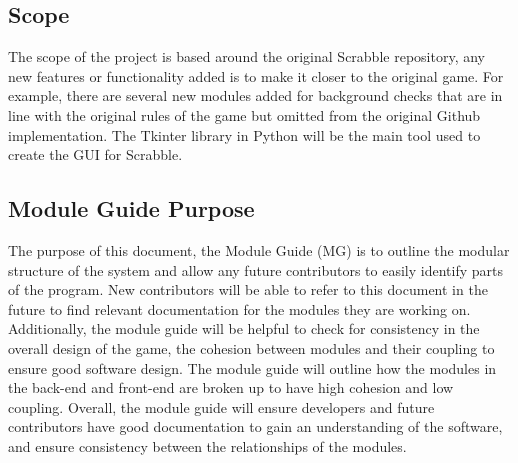 \documentclass[12pt, titlepage]{article}
\begin{document}
\subsection{Scope}

The scope of the project is based around the original Scrabble repository, any new features or functionality added is to make it closer to the original game. For example, there are several new modules added for background checks that are in line with the original rules of the game but omitted from the original Github implementation. The Tkinter library in Python will be the main tool used to create the GUI for Scrabble.

\subsection{Module Guide Purpose}
The purpose of this document, the Module Guide (MG) is to outline the modular structure of the system and allow any future contributors to easily identify parts of the program. New contributors will be able to refer to this document in the future to find relevant documentation for the modules they are working on. Additionally, the module guide will be helpful to check for consistency in the overall design of the game, the cohesion between modules and their coupling to ensure good software design. The module guide will outline how the modules in the back-end and front-end are broken up to have high cohesion and low coupling. Overall, the module guide will ensure developers and future contributors have good documentation to gain an understanding of the software, and ensure consistency between the relationships of the modules.


\end{document}
